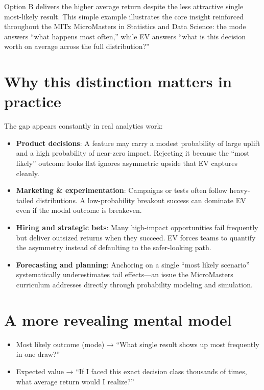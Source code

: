 \documentclass[11pt,a4paper]{article}
\begin{document}
Option B delivers the higher average return despite the less attractive single most-likely result. This simple example illustrates the core insight reinforced throughout the MITx MicroMasters in Statistics and Data Science: the mode answers “what happens most often,” while EV answers “what is this decision worth on average across the full distribution?”

\section{Why this distinction matters in practice}

The gap appears constantly in real analytics work:

\begin{itemize}
    \item \textbf{Product decisions}: A feature may carry a modest probability of large uplift and a high probability of near-zero impact. Rejecting it because the “most likely” outcome looks flat ignores asymmetric upside that EV captures cleanly.
    \item \textbf{Marketing \& experimentation}: Campaigns or tests often follow heavy-tailed distributions. A low-probability breakout success can dominate EV even if the modal outcome is breakeven.
    \item \textbf{Hiring and strategic bets}: Many high-impact opportunities fail frequently but deliver outsized returns when they succeed. EV forces teams to quantify the asymmetry instead of defaulting to the safer-looking path.
    \item \textbf{Forecasting and planning}: Anchoring on a single “most likely scenario” systematically underestimates tail effects—an issue the MicroMasters curriculum addresses directly through probability modeling and simulation.
\end{itemize}

\section{A more revealing mental model}

\begin{itemize}
    \item Most likely outcome (mode) → “What single result shows up most frequently in one draw?”
    \item Expected value → “If I faced this exact decision class thousands of times, what average return would I realize?”
\end{itemize}
\end{document}
